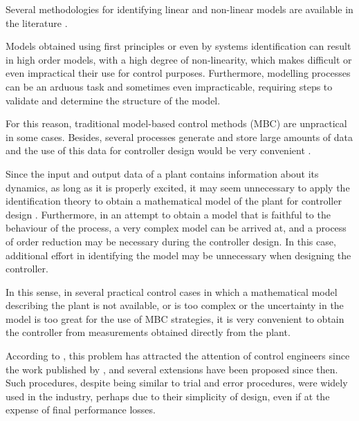 Several methodologies for identifying linear and non-linear models are available in the literature \citep{aguirre2015, ljung1999}.

Models obtained using first principles or even by systems identification can result in high order models, with a high degree of non-linearity, which makes difficult or even impractical their use for control purposes.
Furthermore, modelling processes can be an arduous task and sometimes even impracticable, requiring steps to validate and determine the structure of the model. 

For this reason, traditional model-based control methods (MBC) are unpractical in some cases. Besides, several processes generate and store large amounts of data and the use of this data for controller design would be very convenient \citep{hou2013}.

Since the input and output data of a plant contains information about its dynamics, as long as it is properly excited, it may seem unnecessary to apply the identification theory to obtain a mathematical model of the plant for controller design \citep{ikeda2001}.
Furthermore, in an attempt to obtain a model that is faithful to the behaviour of the process, a very complex model can be arrived at, and a process of order reduction may be necessary during the controller design. In this case, additional effort in identifying the model may be unnecessary when designing the controller.

In this sense, in several practical control cases in which a mathematical model describing the plant is not available, or is too complex or the uncertainty in the model is too great for the use of MBC strategies, it is very convenient to obtain the controller from measurements obtained directly from the plant.

According to \cite{campi2002}, this problem has attracted the attention of control engineers since the work published by \cite{ziegler1942}, and several extensions have been proposed since then.
Such procedures, despite being similar to trial and error procedures, were widely used in the industry, perhaps due to their simplicity of design, even if at the expense of final performance losses.

